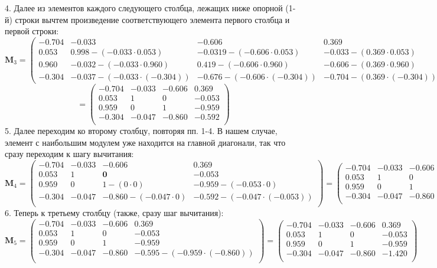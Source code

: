 4. Далее из элементов каждого следующего столбца, лежащих ниже опорной (1-й) строки вычтем произведение соответствующего элемента первого столбца и первой строки:
\[
\mathbf{M}_3 =
\begin{pmatrix}
    -0.704 & \mathbf{-0.033}  & \mathbf{-0.606}  & \mathbf{0.369}\\
    \mathit{0.053} &   0.998-(-0.033\cdot0.053) & -0.0319-(-0.606\cdot0.053) & -0.033-(0.369\cdot0.053) \\
    \mathit{0.960} & -0.032-(-0.033\cdot0.960)  &  0.419-(-0.606\cdot0.960) &  -0.606-(0.369\cdot0.960) \\
    \mathit{-0.304} & -0.037-(-0.033\cdot(-0.304)) & -0.676-(-0.606\cdot(-0.304)) &  -0.704-(0.369\cdot(-0.304))
\end{pmatrix}=
\]
\[
=
\begin{pmatrix}
    -0.704 & -0.033 & -0.606 &  0.369 \\
     0.053 &  1     &  0     & -0.053 \\
     0.959 &  0     &  1     & -0.959\\
    -0.304 & -0.047 & -0.860 & -0.592 \\
\end{pmatrix}
\]
5. Далее переходим ко второму столбцу, повторяя пп. 1-4. В нашем случае, элемент с наибольшим модулем уже находится на главной диагонали, так что сразу переходим к шагу вычитания:
\[
\mathbf{M}_4 =
\begin{pmatrix}
    -0.704 & -0.033 & -0.606 &  0.369 \\
    0.053 &  1     &  \mathbf{0}     & \mathbf{-0.053} \\
    0.959 &  \mathit{0}     &  1-(0\cdot0)     & -0.959-(-0.053\cdot0)\\
    -0.304 & \mathit{-0.047} & -0.860-(-0.047\cdot0) & -0.592-(-0.047\cdot(-0.053)) \\
\end{pmatrix} =
\begin{pmatrix}
    -0.704 & -0.033 & -0.606 &  0.369 \\
    0.053 &  1     &  0     & -0.053 \\
    0.959 &  0     &  1     & -0.959\\
    -0.304 & -0.047 & -0.860 & -0.595 \\
\end{pmatrix}
\]
6. Теперь к третьему столбцу (также, сразу шаг вычитания):
\[
\mathbf{M}_5 =
\begin{pmatrix}
    -0.704 & -0.033 & -0.606 &  0.369 \\
    0.053 &  1     &  0     & -0.053 \\
    0.959 &  0     &  1     & \mathbf{-0.959}\\
    -0.304 & -0.047 & \mathit{-0.860} & -0.595-(-0.959\cdot(-0.860)) \\
\end{pmatrix} =
\begin{pmatrix}
    -0.704 & -0.033 & -0.606 &  0.369 \\
    0.053 &  1     &  0     & -0.053 \\
    0.959 &  0     &  1     & -0.959\\
    -0.304 & -0.047 & -0.860 & -1.420 \\
\end{pmatrix}
\]
